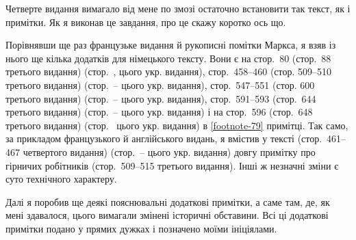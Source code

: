 
Четверте видання вимагало від мене по змозі остаточно встановити
так текст, як і примітки. Як я виконав це завдання, про
це скажу коротко ось що.

Порівнявши ще раз французьке видання й рукописні помітки
Маркса, я взяв із нього ще кілька додатків для німецького тексту.
Вони є на стор.~80 (стор.~88 третього видання)
(стор.~\pageref{original-71}, \pageref{original-72} цього
укр. видання), стор.~458--460 (стор. 509--510 третього видання)
(стор.~\pageref{original-414}--\pageref{original-416} цього укр. видання),
стор.~547--551 (стор. 600 третього видання)
(стор.~\pageref{original-496}--\pageref{original-499} цього укр. видання),
стор.~591--593 (стор.~644 третього видання)
(стор.~\pageref{original-538}--\pageref{original-540} цього укр. видання) і на стор.~596 (стор.~648 третього видання)
(стор.~\pageref{footnote-79} цього укр. видання) в \ref{footnote-79} примітці. Так само, за прикладом французького
й англійського видань, я вмістив у тексті (стор.~461--467 четвертого видання)
(стор.~\pageref{original-416}--\pageref{original-422} цього укр. видання)
довгу примітку про гірничих робітників (стор.~509--515 третього
видання). Інші ж незначні зміни є суто технічного характеру.

Далі я поробив ще деякі пояснювальні додаткові примітки,
а саме там, де, як мені здавалося, цього вимагали змінені історичні
обставини. Всі ці додаткові примітки подано у прямих дужках
і позначено моїми ініціялами.

